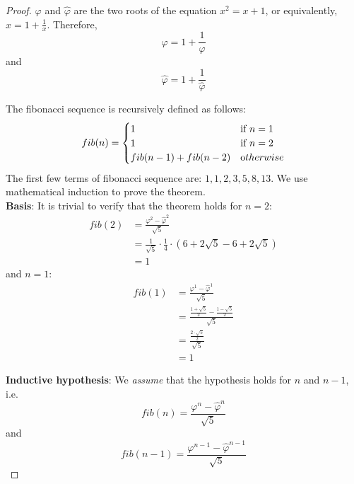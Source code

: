 \documentclass[a4paper]{article}
\renewcommand{\phi}{\varphi}
\begin{document}
\begin{proof}
    $\phi$ and $\hat{\phi}$ are the two roots of the equation $x^2=x+1$, or equivalently, $x = 1 + \frac{1}{x}$. 
    Therefore,  
    \begin{equation}
        \label{eqn: phieq}
        \phi = 1 + \frac{1}{\phi}
    \end{equation}
    and
    \begin{equation}
        \label{eqn: phihateq}
        \hat{\phi} = 1 + \frac{1}{\hat{\phi}}
    \end{equation}

    The fibonacci sequence is recursively defined as follows:
    \begin{equation}
        \label{eqn: fibdef}
        fib(n)=
        \begin{cases}
            1 &\mbox{if } n = 1\\
            1 &\mbox{if } n = 2\\
            fib(n-1) + fib(n-2) &\mbox otherwise
        \end{cases}
    \end{equation}
    The first few terms of fibonacci sequence are: $1, 1, 2, 3, 5, 8, 13$.
    We use mathematical induction to prove the theorem.\\

    \textbf{Basis}: It is trivial to verify that the theorem holds for $n = 2$:
    \begin{align*}
        fib(2)
        &= \frac{\phi^2 - \hat{\phi}^2}{\sqrt{5}}\\
        &= \frac{1}{\sqrt{5}}\cdot \frac{1}{4}\cdot (6+2\sqrt{5}-6+2\sqrt{5})\\
        &= 1
    \end{align*}
    and $n = 1$:
    \begin{align*}
        fib(1) 
        &= \frac{\phi^1 - \hat{\phi}^1}{\sqrt{5}}\\
        &= \frac{\frac{1+\sqrt{5}}{2}-\frac{1-\sqrt{5}}{2}}{\sqrt{5}}\\
        &= \frac{\frac{2\cdot \sqrt{5}}{2}}{\sqrt{5}}\\
        &= 1
    \end{align*}

    \textbf{Inductive hypothesis}:
    We \emph{assume} that the hypothesis holds for $n$ and $n-1$, i.e.
    \begin{equation}
        \label{eqn: fibn-ind-hyp}
        fib(n)=\frac{\phi^{n} - \hat{\phi}^{n}}{\sqrt{5}}
    \end{equation}
    and
    \begin{equation}
        \label{eqn: fibn-1-ind-hyp}
        fib(n-1)=\frac{\phi^{n-1} - \hat{\phi}^{n-1}}{\sqrt{5}}
    \end{equation}


\end{proof}
\end{document}
